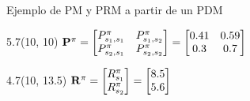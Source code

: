 \documentclass[10pt, envcountsect, handout, aspectratio=1610, hyperref={hypertexnames=true}]{beamer}
\begin{document}
\begin{frame}{Ejemplo de PM y PRM a partir de un PDM}
\TPMargin{0mm}%
\begin{textblock}{5.7}(10, 10) \small
\(
\mathbf{P}^\pi = \begin{bmatrix}
P^\pi_{s_1,s_1} & P^\pi_{s_1,s_2} \\
P^\pi_{s_2,s_1} & P^\pi_{s_2,s_2}
\end{bmatrix} = 
\begin{bmatrix}
0.41 & 0.59 \\
0.3 & 0.7
\end{bmatrix}
\)
\end{textblock}

\TPMargin{0mm}%
\begin{textblock}{4.7}(10, 13.5) \small
\(
\mathbf{R}^\pi = \begin{bmatrix}
R^\pi_{s_1} \\
R^\pi_{s_2}
\end{bmatrix} = 
\begin{bmatrix}
8.5 \\
5.6
\end{bmatrix}
\)
\end{textblock}

\end{frame}
\end{document}
